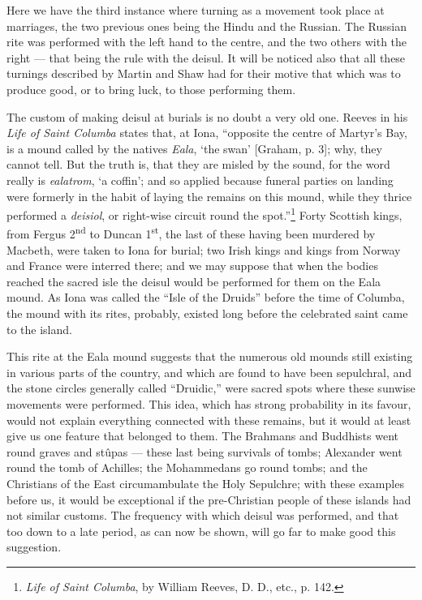 \documentclass[a4paper, 11pt, oneside, polutonikogreek, english]{article}
\begin{document}
Here we have the third instance where turning as a movement took place at marriages, the two previous ones being the Hindu and the Russian. The Russian rite was performed with the left hand to the centre, and the two others with the right --- that being the rule with the deisul. It will be noticed also that all these turnings described by Martin and Shaw had for their motive that which was to produce good, or to bring luck, to those performing them.

The custom of making deisul at burials is no doubt a very old one. Reeves in his \emph{Life of Saint Columba} states that, at Iona, ``opposite the centre of Martyr's Bay, is a mound called by the natives \emph{Eala}, `the swan' [Graham, p. 3]; why, they cannot tell. But the truth is, that they are misled by the sound, for the word really is \emph{ealatrom}, `a coffin'; and so applied because funeral parties on landing were formerly in the habit of laying the remains on this mound, while they thrice performed a \emph{deisiol}, or right-wise circuit round the spot.''\footnote{\emph{Life of Saint Columba}, by William Reeves, D. D., etc., p. 142.} Forty Scottish kings, from Fergus 2\textsuperscript{nd} to Duncan 1\textsuperscript{st}, the last of these having been murdered by Macbeth, were taken to Iona for burial; two Irish kings and kings from Norway and France were interred there; and we may suppose that when the bodies reached the sacred isle the deisul would be performed for them on the Eala mound. As Iona was called the ``Isle of the Druids'' before the time of Columba, the mound with its rites, probably, existed long before the celebrated saint came to the island.

This rite at the Eala mound suggests that the numerous old mounds still existing in various parts of the country, and which are found to have been sepulchral, and the stone circles generally called ``Druidic,'' were sacred spots where these sunwise movements were performed. This idea, which has strong probability in its favour, would not explain everything connected with these remains, but it would at least give us one feature that belonged to them. The Brahmans and Buddhists went round graves and stûpas --- these last being survivals of tombs; Alexander went round the tomb of Achilles; the Mohammedans go round tombs; and the Christians of the East circumambulate the Holy Sepulchre; with these examples before us, it would be exceptional if the pre-Christian people of these islands had not similar customs. The frequency with which deisul was performed, and that too down to a late period, as can now be shown, will go far to make good this suggestion.
\end{document}
